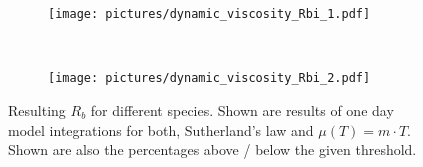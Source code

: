 \documentclass[manuscript]{copernicus}
\begin{document}
\begin{figure}[!htbp]
  \centering
  \begin{subfigure}[b]{1.\textwidth}
    \texttt{[image: pictures/dynamic\_viscosity\_Rbi\_1.pdf]}
    \caption{}
  \end{subfigure}
  \\
  \begin{subfigure}[b]{1.\textwidth}
    \texttt{[image: pictures/dynamic\_viscosity\_Rbi\_2.pdf]}
    \caption{}
  \end{subfigure}
  \caption{Resulting $R_b$ for different species. Shown are results of one day model integrations for both, Sutherland's law and $\mu(T) = m\cdot T$. Shown are also the percentages above / below the given threshold.}
\end{figure}
\clearpage
\end{document}
